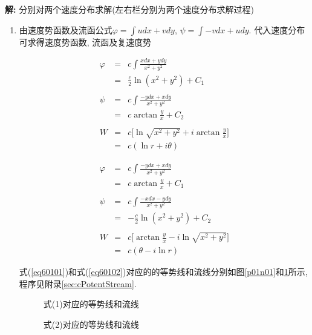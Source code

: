 \begin{solution}
\textbf{解:} 分别对两个速度分布求解(左右栏分别为两个速度分布求解过程)
\begin{enumerate}
\item
由速度势函数及流函公式$\varphi = \int udx + vdy$, $\psi = \int -vdx + udy$. 代入速度分布可求得速度势函数, 流函及复速度势
\setlength{\columnseprule}{0.4pt}
\begin{multicols}{2}
\setlength{\abovedisplayskip}{-10pt}
\begin{eqnarray}
\varphi &=& c\int \frac{xdx + ydy}{x^2+y^2}\nonumber\\
 &=& \frac{c}{2}\ln(x^2+y^2) + C_1\nonumber\\
 & &\nonumber\\
\psi &=& c\int \frac{-ydx + xdy}{x^2+y^2}\nonumber\\
     &=& c\arctan\frac{y}{x} + C_2\nonumber\\
     & &\nonumber\\
W &=& c\Big[\ln\sqrt{x^2+y^2} + i\arctan\frac{y}{x}\Big]\nonumber\\
  &=& c(\ln r + i\theta)\nonumber
\end{eqnarray}


\begin{eqnarray}
\varphi &=& c\int \frac{-ydx + xdy}{x^2+y^2}\nonumber\\
 &=& c\arctan\frac{y}{x} + C_1\nonumber\\
 & &\nonumber\\
\psi &=& c\int \frac{-xdx - ydy}{x^2+y^2}\nonumber\\
     &=& -\frac{c}{2}\ln(x^2+y^2) + C_2\nonumber\\
     & &\nonumber\\
W &=& c\Big[\arctan\frac{y}{x}- i\ln\sqrt{x^2+y^2}\Big]\nonumber\\
  &=& c(\theta - i\ln r)\nonumber
\end{eqnarray}
\end{multicols}
式(\ref{eq60101})和式(\ref{eq60102})对应的的等势线和流线分别如图\ref{p01n01}和\ref{p01n02}所示, 程序见附录\ref{sec:cPotentStream}.
\begin{figure}[!htb]
\begin{minipage}[b]{.5\textwidth}
\centering

\caption{\label{p01n01}式(1)对应的等势线和流线}
\end{minipage}%
\begin{minipage}[b]{.5\textwidth}
\centering

\caption{\label{p01n02}式(2)对应的等势线和流线}
\end{minipage}
\end{figure}


\end{enumerate}
\end{solution}
